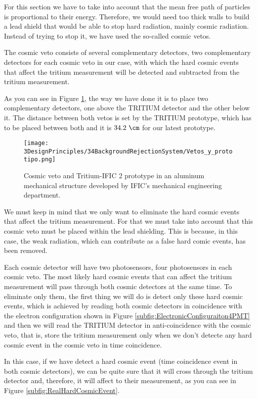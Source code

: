 For this section we have to take into account that the mean free path of particles is proportional to their energy. Therefore, we would need too thick walls to build a lead shield that would be able to stop hard radiation, mainly cosmic radiation. Instead of trying to stop it, we have used the so-called cosmic vetos.

The cosmic veto consists of several complementary detectors, two complementary detectors for each cosmic veto in our case, with which the hard cosmic events that affect the tritium measurement will be detected and subtracted from the tritium measurement.

As you can see in Figure \ref{fig:VetoAndPrototype}, the way we have done it is to place two complementary detectors, one above the TRITIUM detector and the other below it. The distance between both vetos is set by the TRITIUM prototype, which has to be placed between both and it is $34.2~\cm$ for our latest prototype.

\begin{figure}[h]
\centering
\texttt{[image: 3DesignPrinciples/34BackgroundRejectionSystem/Vetos\_y\_prototipo.png]}
\caption{Cosmic veto and Tritium-IFIC 2 prototype in an aluminum mechanical structure developed by IFIC's mechanical engineering department.\label{fig:VetoAndPrototype}}
\end{figure}

We must keep in mind that we only want to eliminate the hard cosmic events that affect the tritium measurement. For that we must take into account that this cosmic veto must be placed within the lead shielding. This is because, in this case, the weak radiation, which can contribute as a false hard comic events, has been removed.

Each cosmic detector will have two photosensors, four photosensors in each cosmic veto. The most likely hard cosmic events that can affect the tritium measurement will pass through both cosmic detectors at the same time. To eliminate only them, the first thing we will do is detect only these hard cosmic events, which is achieved by reading both cosmic detectors in coincidence with the electron configuration shown in Figure \ref{subfig:ElectronicConfiguraiton4PMT} and then we will read the TRITIUM detector in anti-coincidence with the cosmic veto, that is, store the tritium measurement only when we don't detecte any hard cosmic event in the cosmic veto in time coincidence. 

In this case, if we have detect a hard cosmic event (time coincidence event in both cosmic detectors), we can be quite sure that it will cross through the tritium detector and, therefore, it will affect to their measurement, as you can see in Figure \ref{subfig:RealHardCosmicEvent}.

